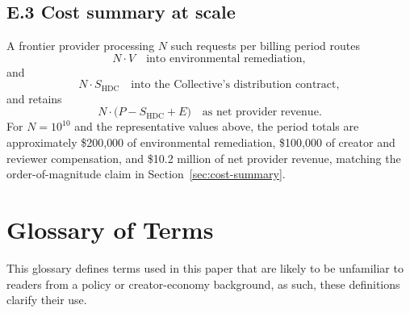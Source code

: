 \documentclass[10pt,a4paper,twocolumn]{article}
\begin{document}
\subsection*{E.3 Cost summary at scale}

A frontier provider processing $N$ such requests per billing period routes
\[
N \cdot V \quad \text{into environmental remediation},
\]
and
\[
N \cdot S_{\mathrm{HDC}} \quad \text{into the Collective's distribution contract},
\]
and retains
\[
N \cdot \bigl(P - S_{\mathrm{HDC}} + E\bigr) \quad \text{as net provider revenue}.
\]
For $N = 10^{10}$ and the representative values above, the period totals are approximately \$200{,}000 of environmental remediation, \$100{,}000 of creator and reviewer compensation, and \$10.2 million of net provider revenue, matching the order-of-magnitude claim in Section~\ref{sec:cost-summary}.

\section{Glossary of Terms}
\label{sec:appendix-glossary}

This glossary defines terms used in this paper that are likely to be unfamiliar to readers from a policy or creator-economy background, as such, these definitions clarify their use.
\end{document}
